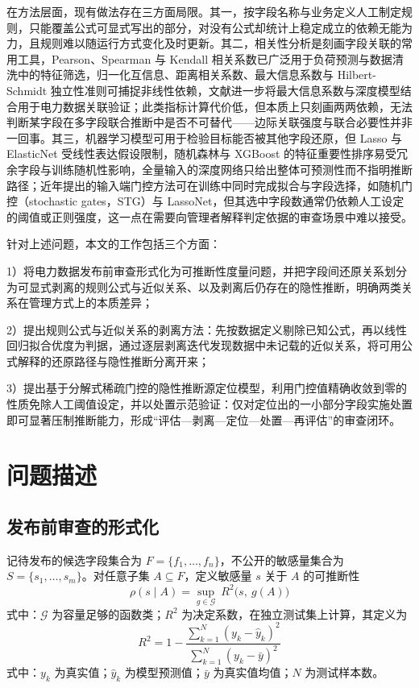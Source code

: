 \documentclass[UTF8,zihao=5,twoside]{ctexart}
\begin{document}
在方法层面，现有做法存在三方面局限。其一，按字段名称与业务定义人工制定规则，只能覆盖公式可显式写出的部分，对没有公式却统计上稳定成立的依赖无能为力，且规则难以随运行方式变化及时更新。其二，相关性分析是刻画字段关联的常用工具，Pearson、Spearman 与 Kendall 相关系数\cite{ref-pearson,ref-spearman,ref-kendall}已广泛用于负荷预测与数据清洗中的特征筛选\cite{ref-lan-load,ref-jiao-pv,ref-deng-load}，归一化互信息\cite{ref-cover-info}、距离相关系数\cite{ref-szekely-dcorr}、最大信息系数\cite{ref-reshef-mic}与 Hilbert-Schmidt 独立性准则\cite{ref-gretton-hsic}可捕捉非线性依赖，文献\cite{ref-xing-micdnn}进一步将最大信息系数与深度模型结合用于电力数据关联验证；此类指标计算代价低，但本质上只刻画两两依赖，无法判断某字段在多字段联合推断中是否不可替代——边际关联强度与联合必要性并非一回事。其三，机器学习模型可用于检验目标能否被其他字段还原\cite{ref-tibshirani-lasso,ref-zou-enet,ref-breiman-rf,ref-chen-xgboost,ref-lecun-deep}，但 Lasso 与 ElasticNet 受线性表达假设限制，随机森林与 XGBoost 的特征重要性排序易受冗余字段与训练随机性影响，全量输入的深度网络只给出整体可预测性而不指明推断路径；近年提出的输入端门控方法可在训练中同时完成拟合与字段选择，如随机门控（stochastic gates，STG）\cite{ref-stg}与 LassoNet\cite{ref-lassonet}，但其选中字段数通常仍依赖人工设定的阈值或正则强度，这一点在需要向管理者解释判定依据的审查场景中难以接受。

针对上述问题，本文的工作包括三个方面：

1）将电力数据发布前审查形式化为可推断性度量问题，并把字段间还原关系划分为可显式剥离的规则公式与近似关系、以及剥离后仍存在的隐性推断，明确两类关系在管理方式上的本质差异；

2）提出规则公式与近似关系的剥离方法：先按数据定义剔除已知公式，再以线性回归拟合优度为判据，通过逐层剥离迭代发现数据中未记载的近似关系，将可用公式解释的还原路径与隐性推断分离开来；

3）提出基于分解式稀疏门控的隐性推断源定位模型，利用门控值精确收敛到零的性质免除人工阈值设定，并以处置示范验证：仅对定位出的一小部分字段实施处置即可显著压制推断能力，形成“评估—剥离—定位—处置—再评估”的审查闭环。

\section{问题描述}

\subsection{发布前审查的形式化}

记待发布的候选字段集合为 $F=\{f_1,\dots,f_n\}$，不公开的敏感量集合为 $S=\{s_1,\dots,s_m\}$。对任意子集 $A\subseteq F$，定义敏感量 $s$ 关于 $A$ 的可推断性
\begin{equation}
\rho(s\mid A)=\sup_{g\in\mathcal{G}}\ R^2\big(s,\ g(A)\big)
\end{equation}
式中：$\mathcal{G}$ 为容量足够的函数类；$R^2$ 为决定系数，在独立测试集上计算，其定义为
\begin{equation}
R^2=1-\frac{\sum_{k=1}^{N}(y_k-\hat y_k)^2}{\sum_{k=1}^{N}(y_k-\bar y)^2}
\end{equation}
式中：$y_k$ 为真实值；$\hat y_k$ 为模型预测值；$\bar y$ 为真实值均值；$N$ 为测试样本数。
\end{document}

